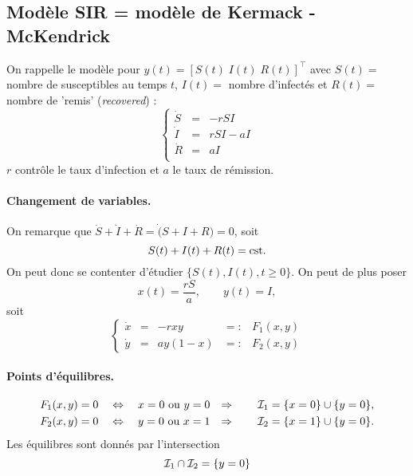 \subsection{Modèle SIR = modèle de Kermack - McKendrick}

On rappelle le modèle pour $y(t) = [S(t) \; I(t) \; R(t)]^\top$ avec $S(t) =$ nombre de susceptibles au temps $t$, $I(t) =$ nombre d'infectés et $R(t) =$ nombre de 'remis' ({\em recovered}) :
$$
\left\{ \begin{array}{rcl} 
\dot S & = & - r S I \\
\dot I & = & r S I - a I \\
\dot R & = & a I \\
\end{array} \right.
$$
$r$ contrôle le taux d'infection et $a$ le taux de rémission.

\paragraph{Changement de variables.}
On remarque que $\dot S + \dot I + \dot R = \dot (S + I + R) = 0$, soit 
$$
S(t) + I(t) + R(t) = \text{cst}.
$$
On peut donc se contenter d'étudier $\{S(t), I(t), t \geq 0\}$. On peut de plus poser 
$$
x(t) = \frac{rS}a, \qquad y(t) = I,
$$
soit
$$
\left\{\begin{array}{rclcl}
        \dot x & = & -r x y & =: & F_1(x, y) \\
        \dot y & = & a y (1-x) & =: & F_2(x, y)
       \end{array}\right.
$$

\paragraph{Points d'équilibres.}
\begin{align*}
  F_1(x, y) & = 0 \quad \Leftrightarrow \quad x = 0 \text{ ou } y = 0 &
  \Rightarrow \qquad \mathcal{I}_1 & = \{x = 0\} \cup \{y = 0\}, \\
  F_2(x, y) & = 0 \quad \Leftrightarrow \quad y = 0 \text{ ou } x = 1 &
  \Rightarrow \qquad \mathcal{I}_2 & = \{x = 1\} \cup \{y = 0\}.
\end{align*}
Les équilibres sont donnés par l'intersection 
$$
\mathcal{I}_1 \cap \mathcal{I}_2 = \{y = 0\}
$$


